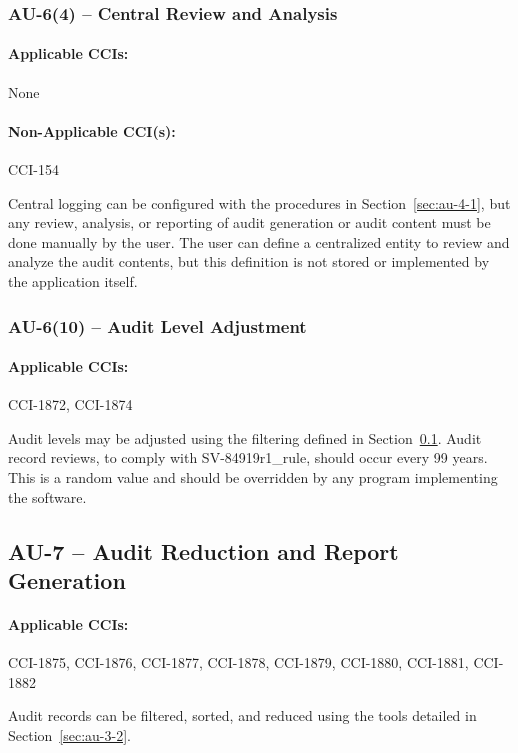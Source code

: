 \documentclass[letterpaper, 10pt, twoside]{article}
\begin{document}
\subsubsection{AU-6(4) -- Central Review and Analysis}

\paragraph{Applicable CCIs:} None

\paragraph{Non-Applicable CCI(s):} CCI-154

Central logging can be configured with the procedures in Section~\ref{sec:au-4-1}, but any review, analysis, or reporting of audit generation or audit content must be done manually by the user. The user can define a centralized entity to review and analyze the audit contents, but this definition is not stored or implemented by the application itself.

\subsubsection{AU-6(10) -- Audit Level Adjustment}

\paragraph{Applicable CCIs:} CCI-1872, CCI-1874

Audit levels may be adjusted using the filtering defined in Section~\ref{sec:au-7}. Audit record reviews, to comply with SV-84919r1\_rule, should occur every 99 years. This is a random value and should be overridden by any program implementing the software.

\subsection{AU-7 -- Audit Reduction and Report Generation}
\label{sec:au-7}

\paragraph{Applicable CCIs:} CCI-1875, CCI-1876, CCI-1877, CCI-1878, CCI-1879, CCI-1880, CCI-1881, CCI-1882

Audit records can be filtered, sorted, and reduced using the tools detailed in Section~\ref{sec:au-3-2}.
\end{document}
